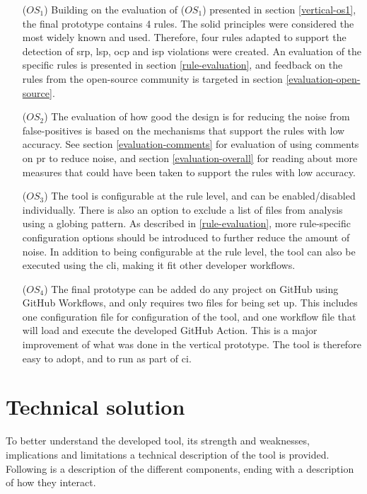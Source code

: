 \documentclass[pdftex,10pt,b5paper,twoside]{report}
\begin{document}
\begin{itemize}
    \item [(\(OS_{1}\))] Building on the evaluation of (\(OS_{1}\)) presented in section \ref{vertical-os1}, the final prototype contains 4 rules. The \gls{solid} principles were considered the most widely known and used. Therefore, four rules adapted to support the detection of \gls{srp}, \gls{lsp}, \gls{ocp} and \gls{isp} violations were created. An evaluation of the specific rules is presented in section \ref{rule-evaluation}, and feedback on the rules from the open-source community is targeted in section \ref{evaluation-open-source}.
    
    \item [(\(OS_{2}\))] The evaluation of how good the design is for reducing the noise from false-positives is based on the mechanisms that support the rules with low accuracy. See section \ref{evaluation-comments} for evaluation of using comments on \gls{pr} to reduce noise, and section \ref{evaluation-overall} for reading about more measures that could have been taken to support the rules with low accuracy. 
    
    \item [(\(OS_{3}\))] The tool is configurable at the rule level, and can be enabled/disabled individually. There is also an option to exclude a list of files from analysis using a globing pattern. As described in \ref{rule-evaluation}, more rule-specific configuration options should be introduced to further reduce the amount of noise. In addition to being configurable at the rule level, the tool can also be executed using the \gls{cli}, making it fit other developer workflows. 
    
    \item [(\(OS_{4}\))] The final prototype can be added do any project on GitHub using GitHub Workflows, and only requires two files for being set up. This includes one configuration file for configuration of the tool, and one workflow file that will load and execute the developed GitHub Action. This is a major improvement of what was done in the vertical prototype. The tool is therefore easy to adopt, and to run as part of \gls{ci}.

\end{itemize}

\section{Technical solution}
\label{technical-solution}
To better understand the developed tool, its strength and weaknesses, implications and limitations a technical description of the tool is provided. Following is a description of the different components, ending with a description of how they interact.
\end{document}
